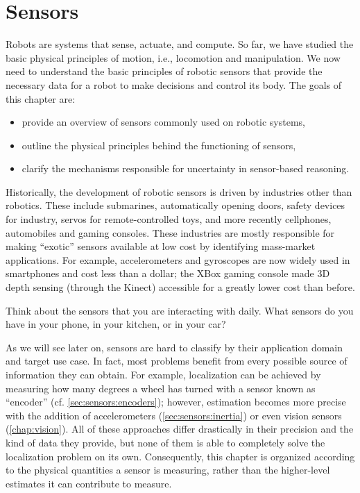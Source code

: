 \chapter{Sensors}\label{chap:sensors}
Robots are systems that sense, actuate, and compute. So far, we have studied the basic physical principles of motion, i.e., locomotion and manipulation. We now need to understand the basic principles of robotic sensors that provide the necessary data for a robot to make decisions and control its body.
%
The goals of this chapter are:
\begin{itemize}
\item provide an overview of sensors commonly used on robotic systems,
\item outline the physical principles behind the functioning of sensors,
\item clarify the mechanisms responsible for uncertainty in sensor-based reasoning.
\end{itemize}

Historically, the development of robotic sensors is driven by industries other than robotics. These include submarines, automatically opening doors, safety devices for industry, servos for remote-controlled toys, and more recently cellphones, automobiles and gaming consoles. These industries are mostly responsible for making ``exotic'' sensors available at low cost by identifying mass-market applications.
For example, accelerometers and gyroscopes are now widely used in smartphones and cost less than a dollar; the XBox gaming console made 3D depth sensing (through the Kinect) accessible for a greatly lower cost than before.

\begin{mdframed}
Think about the sensors that you are interacting with daily. What sensors do you have in your phone, in your kitchen, or in your car?
\end{mdframed}

As we will see later on, sensors are hard to classify by their application domain and target use case. In fact, most problems benefit from every possible source of information they can obtain. For example, localization can be achieved by measuring how many degrees a wheel has turned with a sensor known as ``encoder'' (cf. \cref{sec:sensors:encoders}); however, estimation becomes more precise with the addition of accelerometers (\cref{sec:sensors:inertia}) or even vision sensors (\cref{chap:vision}). All of these approaches differ drastically in their precision and the kind of data they provide, but none of them is able to completely solve the localization problem on its own.
Consequently, this chapter is organized according to the physical quantities a sensor is measuring, rather than the higher-level estimates it can contribute to measure.

